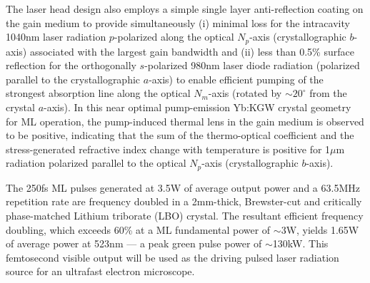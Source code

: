 The laser head design also employs a simple single layer  anti-reflection coating on the gain medium to provide simultaneously (i) minimal loss for the intracavity 1040nm laser radiation $p$-polarized along the optical $N_p$-axis (crystallographic $b$-axis) associated with the largest gain bandwidth and (ii) less than 0.5\% surface reflection for the orthogonally $s$-polarized 980nm laser diode radiation (polarized parallel to the crystallographic $a$-axis) to enable efficient pumping of the strongest absorption line along the optical $N_m$-axis (rotated by $\sim20^\circ$ from the crystal $a$-axis).
In this near optimal pump-emission Yb:KGW crystal geometry for ML operation, the pump-induced thermal lens in the gain medium is observed to be positive, indicating that the sum of the thermo-optical coefficient and the stress-generated refractive index change with temperature is positive for 1$\mu$m radiation polarized parallel to the optical $N_p$-axis (crystallographic $b$-axis).

The 250fs ML pulses generated at 3.5W of average output power and a 63.5MHz repetition rate are frequency doubled in a 2mm-thick, Brewster-cut and critically phase-matched Lithium triborate (LBO) crystal.
The resultant efficient frequency doubling, which exceeds 60\% at a ML fundamental power of $\sim$3W, yields 1.65W of average power at 523nm ---
a peak green pulse power of $\sim$130kW.
This femtosecond visible output will be used as the driving pulsed laser radiation source for an ultrafast electron microscope\cite{king_ultrafast_2005}.

